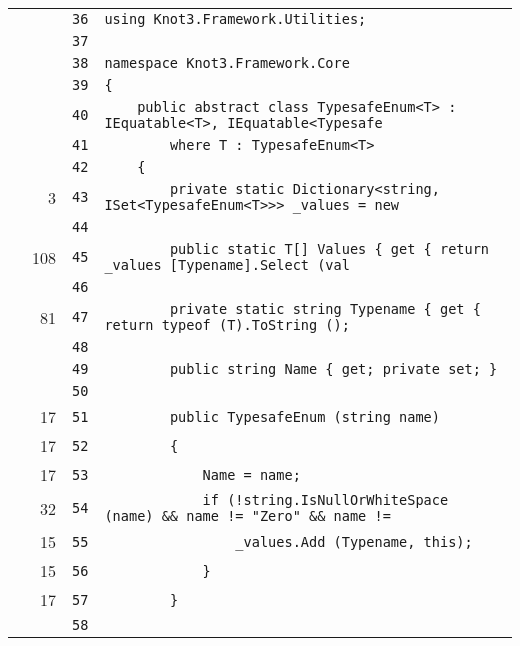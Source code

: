 \documentclass[a4paper,10pt]{article}
\begin{document}
\begin{longtable}[l]{lrrl}
\cellcolor{gray} &  & \verb~36~ & \verb~using Knot3.Framework.Utilities;~\\
\cellcolor{gray} &  & \verb~37~ & \verb~~\\
\cellcolor{gray} &  & \verb~38~ & \verb~namespace Knot3.Framework.Core~\\
\cellcolor{gray} &  & \verb~39~ & \verb~{~\\
\cellcolor{gray} &  & \verb~40~ & \verb~    public abstract class TypesafeEnum<T> : IEquatable<T>, IEquatable<Typesafe~\\
\cellcolor{gray} &  & \verb~41~ & \verb~        where T : TypesafeEnum<T>~\\
\cellcolor{gray} &  & \verb~42~ & \verb~    {~\\
\cellcolor{green} & 3 & \verb~43~ & \verb~        private static Dictionary<string, ISet<TypesafeEnum<T>>> _values = new~\\
\cellcolor{gray} &  & \verb~44~ & \verb~~\\
\cellcolor{green} & 108 & \verb~45~ & \verb~        public static T[] Values { get { return _values [Typename].Select (val~\\
\cellcolor{gray} &  & \verb~46~ & \verb~~\\
\cellcolor{green} & 81 & \verb~47~ & \verb~        private static string Typename { get { return typeof (T).ToString (); ~\\
\cellcolor{gray} &  & \verb~48~ & \verb~~\\
\cellcolor{gray} &  & \verb~49~ & \verb~        public string Name { get; private set; }~\\
\cellcolor{gray} &  & \verb~50~ & \verb~~\\
\cellcolor{green} & 17 & \verb~51~ & \verb~        public TypesafeEnum (string name)~\\
\cellcolor{green} & 17 & \verb~52~ & \verb~        {~\\
\cellcolor{green} & 17 & \verb~53~ & \verb~            Name = name;~\\
\cellcolor{green} & 32 & \verb~54~ & \verb~            if (!string.IsNullOrWhiteSpace (name) && name != "Zero" && name !=~\\
\cellcolor{green} & 15 & \verb~55~ & \verb~                _values.Add (Typename, this);~\\
\cellcolor{green} & 15 & \verb~56~ & \verb~            }~\\
\cellcolor{green} & 17 & \verb~57~ & \verb~        }~\\
\cellcolor{gray} &  & \verb~58~ & \verb~~\\

\end{longtable}
\end{document}
